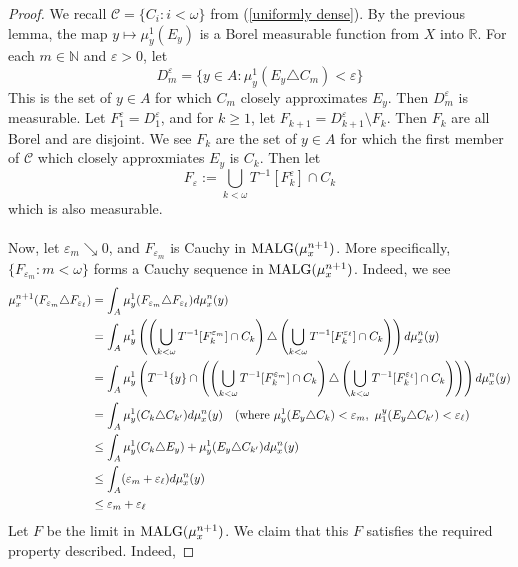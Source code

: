 \documentclass{article}
\newcommand{\N}{\mathbb{N}}
\newcommand{\malg}[1]{\textmd{MALG}(#1)}
\let\oldref\ref
\renewcommand{\ref}[1]{(\oldref{#1})}
\theoremstyle{definition}
\begin{document}
\begin{proof}
    We recall $ \mathcal{C} = \{C_i:i<\omega\} $ from \ref{uniformly dense}. By the previous lemma, the map $ y\mapsto \mu_y^1(E_y) $ is a Borel measurable function from $ X $ into $ \mathbb{R} $. For each $ m\in \N $ and $ \varepsilon>0 $, let
    \[
    D^\varepsilon_m = \{y\in A:\mu_y^1(E_y\triangle C_m)<\varepsilon\}
    \]
    This is the set of $ y\in A $ for which $ C_m $ closely approximates $ E_y $. Then $ D^\varepsilon_m $ is measurable. Let $ F^\varepsilon_1 = D^\varepsilon_1 $, and for $ k\geq 1 $, let $ F_{k+1} = D^\varepsilon_{k+1}\setminus F_k $. Then $ F_k $ are all Borel and are disjoint. We see $ F_k $ are the set of $ y\in A $ for which the first member of $ \mathcal{C} $ which closely approxmiates $ E_y $ is $ C_k $. Then let 
    \[
    F_\varepsilon:= \bigcup_{k<\omega} T^{-1}[F_k^\varepsilon]\cap C_k
    \]
    which is also measurable.\\\\
    Now, let $ \varepsilon_m \searrow 0 $, and $ F_{\varepsilon_m} $ is Cauchy in $ \malg{\mu_x^{n+1}} $. More specifically, $ \{F_{\varepsilon_m}:m<\omega\} $ forms a Cauchy sequence in $ \malg{\mu_x^{n+1}} $. Indeed, we see
    \begin{align*}
        \mu_x^{n+1}(F_{\varepsilon_m}\triangle F_{\varepsilon_\ell}) &= \int_A \mu_y^1(F_{\varepsilon_m}\triangle F_{\varepsilon_{\ell}})d\mu_x^{n}(y)\\
        &= \int_A \mu_y^1\left(\left(\bigcup_{k<\omega}T^{-1}[F^{\varepsilon_m}_k]\cap C_k\right)\triangle\left(\bigcup_{k<\omega}T^{-1}[F^{\varepsilon_\ell}_k]\cap C_k\right)\right)d\mu_x^{n}(y)\\
        &= \int_A \mu_y^1\left(T^{-1}\{y\}\cap \left(\left(\bigcup_{k<\omega}T^{-1}[F^{\varepsilon_m}_k]\cap C_k\right)\triangle\left(\bigcup_{k<\omega}T^{-1}[F^{\varepsilon_\ell}_k]\cap C_k\right)\right)\right)d\mu_x^n(y)\\
        &= \int_A \mu_y^1(C_k\triangle C_{k'})d\mu_x^n(y)\quad (\textmd{where }\mu_y^1(E_y\triangle C_k)<\varepsilon_m,\textmd{ }\mu^y_1(E_y\triangle C_{k'})<\varepsilon_\ell)\\
        &\leq \int_A \mu_y^1(C_k\triangle E_y) + \mu_y^1(E_y\triangle C_{k'})d\mu_x^n(y)\\
        &\leq \int_A (\varepsilon_m + \varepsilon_\ell) d\mu_x^n(y)\\
        &\leq \varepsilon_m+\varepsilon_\ell
    \end{align*}
    Let $ F $ be the limit in $ \malg{\mu_x^{n+1}} $. We claim that this $ F $ satisfies the required property described. Indeed, 

\end{proof}
\end{document}
